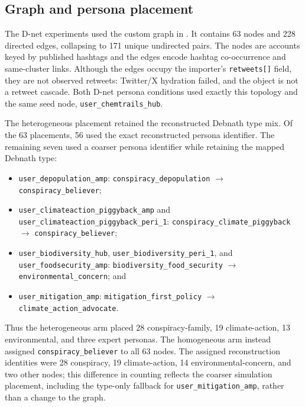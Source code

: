 \subsection{Graph and persona placement}

The D-net experiments used the custom graph in
.
It contains 63 nodes and 228 directed edges, collapsing to 171 unique
undirected pairs.  The nodes are accounts keyed by published hashtags and
the edges encode hashtag co-occurrence and same-cluster links.  Although the
edges occupy the importer's \texttt{retweets[]} field, they are not observed
retweets: Twitter/X hydration failed, and the object is not a retweet
cascade.  Both D-net persona conditions used exactly this topology and the
same seed node, \texttt{user\_chemtrails\_hub}.

The heterogeneous placement retained the reconstructed Debnath type mix.
Of the 63 placements, 56 used the exact reconstructed persona identifier.
The remaining seven used a coarser persona identifier while retaining the
mapped Debnath type:
\begin{itemize}
  \item \texttt{user\_depopulation\_amp}:
  \texttt{conspiracy\_depopulation} $\rightarrow$
  \texttt{conspiracy\_believer};
  \item \texttt{user\_climateaction\_piggyback\_amp} and
  \texttt{user\_climateaction\_piggyback\_peri\_1}:
  \texttt{conspiracy\_climate\_piggyback} $\rightarrow$
  \texttt{conspiracy\_believer};
  \item \texttt{user\_biodiversity\_hub},
  \texttt{user\_biodiversity\_peri\_1}, and
  \texttt{user\_foodsecurity\_amp}:
  \texttt{biodiversity\_food\_security} $\rightarrow$
  \texttt{environmental\_concern}; and
  \item \texttt{user\_mitigation\_amp}:
  \texttt{mitigation\_first\_policy} $\rightarrow$
  \texttt{climate\_action\_advocate}.
\end{itemize}
Thus the heterogeneous arm placed 28 conspiracy-family, 19
climate-action, 13 environmental, and three expert personas.  The
homogeneous arm instead assigned \texttt{conspiracy\_believer} to all 63
nodes.  The assigned reconstruction identities were 28 conspiracy, 19
climate-action, 14 environmental-concern, and two other nodes; this
difference in counting reflects the coarser simulation placement, including
the type-only fallback for \texttt{user\_mitigation\_amp}, rather than a
change to the graph.


